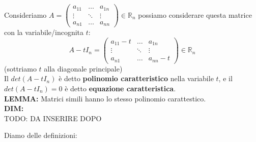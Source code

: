 Consideriamo $A = \begin{pmatrix}
a_{11} & \dots & a_{1n}\\
\vdots & \ddots & \vdots \\
a_{n1} & \dots & a_{nn}
\end{pmatrix} \in \mathbb{R}_n$
possiamo considerare questa matrice con la variabile/incognita $t$:
$$A-tI_n = \begin{pmatrix}
a_{11}-t & \dots & a_{1n}\\
\vdots & \ddots & \vdots \\
a_{n1} & \dots & a_{nn}-t
\end{pmatrix} \in \mathbb{R}_n$$
(sottriamo $t$ alla diagonale principale)\\
Il $det(A-tI_n)$ è detto \textbf{polinomio caratteristico} nella variabile $t$, e il $det(A-tI_n) = 0$ è detto \textbf{equazione caratteristica}.\\

\textbf{LEMMA:} Matrici simili hanno lo stesso polinomio carattestico.\\
\textbf{DIM:}\\
TODO: DA INSERIRE DOPO

Diamo delle definizioni:

